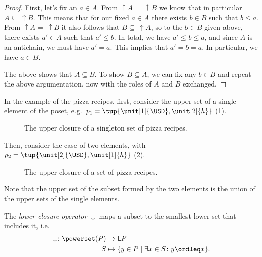 \begin{proof}
    First, let's fix an $a \in A$. From $\uparrow A = \ \uparrow B$ we know that in particular $A \subseteq \ \uparrow B$. This means that for our fixed $a \in A$ there exists $b \in B$ such that $b \leq a$. From $\uparrow A = \ \uparrow B$ it also follows that $B \subseteq \ \uparrow A$, so to the  $b \in B$ given above, there exists $a' \in A$ such that $a' \leq b$. In total, we have $a' \leq b \leq a$, and since $A$ is an antichain, we must have $a' = a$. This implies that $a' = b = a$. In particular, we have $a \in B$.

    The above shows that $A \subseteq B$. To show $B \subseteq A$, we can fix any $b \in B$ and repeat the above argumentation, now with the roles of $A$ and $B$ exchanged.
\end{proof}

In the example of the pizza recipes, first, consider the upper set of a single element of the poset, e.g.~$p_1=\tup{\unit[1]{\USD},\unit[2]{h}}$  (\cref{fig:upperclosure_1}).
\begin{figure}[h!]
    \begin{center}
    \end{center}
    \caption{The upper closure of a singleton set of pizza recipes. \label{fig:upperclosure_1}}
\end{figure}
Then, consider the case of two elements, with~$p_2=\tup{\unit[2]{\USD},\unit[1]{h}}$ (\cref{fig:upperclosure_2}).

\begin{figure}[h!]
    \begin{center}
    \end{center}
    \caption{The upper closure of a set of pizza recipes. \label{fig:upperclosure_2}}
\end{figure}
Note that the upper set of the subset formed by the two elements is the union of the upper sets of the single elements.

\begin{definition}
    The \emph{lower closure operator} $\downarrow$ maps a subset to the smallest lower set that includes it, i.e.
    \begin{equation}
        \begin{aligned}
            \downarrow\colon \powerset(P)&\to \mathsf{L}P\\
            S&\mapsto \{ y\in P \mid \exists x\in S \colon y\ordleq x\}.
        \end{aligned}
    \end{equation}
\end{definition}

